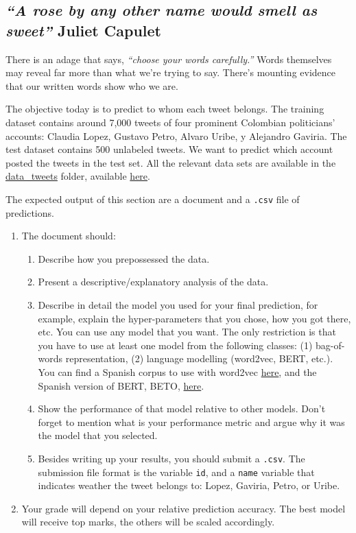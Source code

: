 \documentclass[12pt,onecolumn]{article}
\begin{document}
\subsection{{\it ``A rose by any other name would smell as sweet''} Juliet Capulet}

There is an adage that says, {\it “choose your words carefully.”} Words themselves may reveal far more than what we’re trying to say. There’s mounting evidence that our written words show who we are.

The objective today is to predict to whom each tweet belongs. The training dataset contains around 7,000 tweets of four prominent Colombian politicians' accounts: Claudia Lopez, Gustavo Petro, Alvaro Uribe, y Alejandro Gaviria. The test dataset contains 500 unlabeled tweets. We want to predict which account posted the tweets in the test set. All the relevant data sets are available in the \href{https://www.dropbox.com/s/gewpk6r1ii9u5h3/data_tweets.zip?dl=0}{data\_tweets} folder, available \href{https://www.dropbox.com/s/gewpk6r1ii9u5h3/data_tweets.zip?dl=0}{here}.


The expected output of this section are a document and a \texttt{.csv} file of predictions. 

\begin{enumerate}
  \item  The document should:
  \begin{enumerate}
    \item Describe how you prepossessed the data.
    \item Present a descriptive/explanatory analysis of the data.
    \item Describe in detail the model you used for your final prediction, for example, explain the hyper-parameters that you chose, how you got there, etc.  You can use any model that you want. The only restriction is that you have to use at least one model from the following classes: (1) bag-of-words representation, (2) language modelling (word2vec, BERT, etc.). You can find a Spanish corpus to use with word2vec \href{https://crscardellino.ar/SBWCE/}{here}, and the Spanish version of BERT, BETO, \href{https://github.com/dccuchile/beto}{here}.
    \item Show the performance of that model relative to other models. Don't forget to mention what is your performance metric and argue why it was the model that you selected.
    \item Besides writing up your results, you should submit a \texttt{.csv}. The submission file format is the variable \texttt{id}, and a \texttt{name} variable that indicates weather the tweet belongs to: Lopez, Gaviria, Petro, or Uribe. 
  \end{enumerate}
  \item Your grade will depend on your relative prediction accuracy. The best model will receive top marks, the others will be scaled accordingly.
  
\end{enumerate}
\end{document}
